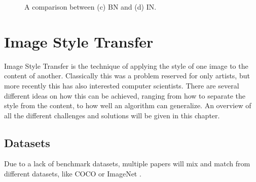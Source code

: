 \begin{figure}
	\centering
	\caption{A comparison between (c) \gls{BN} and (d) \gls{IN}.\cite{Ulyanov2017}}
	\label{fig:style_transfer_ulyanov_BN_IN_comparison}
\end{figure}

\section{Image Style Transfer}
Image Style Transfer is the technique of applying the style of one image to the content of another.
Classically this was a problem reserved for only artists, but more recently this has also interested computer scientists.
There are several different ideas on how this can be achieved,
ranging from how to separate the style from the content, to how well an algorithm can generalize.
An overview of all the different challenges and solutions will be given in this chapter.

\subsection{Datasets}
Due to a lack of benchmark datasets, multiple papers will mix and match from different datasets, like \gls{COCO} or ImageNet \cite{Deng2009}.


